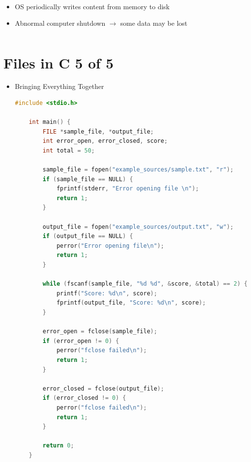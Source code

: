 \documentclass[12pt]{article}
\begin{document}
\begin{itemize}
\begin{itemize}
        \begin{itemize}
            \item OS periodically writes content from memory to disk
            \item Abnormal computer shutdown $\to$ some data may be lost
        \end{itemize}
    \end{itemize}

    \begin{lstlisting}[language=c]

    \end{lstlisting}
\end{itemize}

\bigskip


\bigskip

\section*{Files in C 5 of 5}

\bigskip

\begin{itemize}
    \item Bringing Everything Together

    \begin{lstlisting}[language=c,caption={files\_example\_5.c}]
    #include <stdio.h>

    int main() {
        FILE *sample_file, *output_file;
        int error_open, error_closed, score;
        int total = 50;

        sample_file = fopen("example_sources/sample.txt", "r");
        if (sample_file == NULL) {
            fprintf(stderr, "Error opening file \n");
            return 1;
        }

        output_file = fopen("example_sources/output.txt", "w");
        if (output_file == NULL) {
            perror("Error opening file\n");
            return 1;
        }

        while (fscanf(sample_file, "%d %d", &score, &total) == 2) {
            printf("Score: %d\n", score);
            fprintf(output_file, "Score: %d\n", score);
        }

        error_open = fclose(sample_file);
        if (error_open != 0) {
            perror("fclose failed\n");
            return 1;
        }

        error_closed = fclose(output_file);
        if (error_closed != 0) {
            perror("fclose failed\n");
            return 1;
        }

        return 0;
    }
    \end{lstlisting}

\end{itemize}
\end{document}

